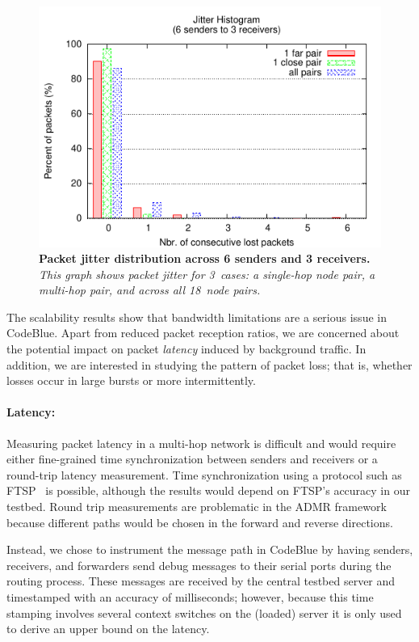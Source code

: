 \begin{figure}[t]
\begin{center}
\includegraphics[width=.6\hsize]{./resources/codeblue-nsdi06/figures/jitter6Send3Recv.pdf}
\end{center}
\caption{{\small {\bf Packet jitter distribution across 
6 senders and 3 receivers.} {\em This graph shows packet jitter
for 3~cases: a single-hop node pair, a multi-hop pair, and
across all 18~node pairs.}}}
\label{fig-jitter6Send3Recv}
\end{figure}

The scalability results show that bandwidth limitations are a serious
issue in CodeBlue. Apart from reduced
packet reception ratios, we are concerned about the potential
impact on packet {\em latency} induced by background traffic.
In addition, we are interested in studying the pattern of packet
loss; that is, whether losses occur in large bursts or more intermittently.

\paragraph*{Latency:}
Measuring packet latency in a multi-hop network is difficult and would 
require either fine-grained time synchronization between senders and 
receivers or a round-trip latency measurement. Time synchronization
using a protocol such as FTSP~\cite{ftsp} is possible, although the
results would depend on FTSP's accuracy in our testbed.
Round trip measurements are problematic in the ADMR framework 
because different paths would be chosen in the forward and reverse 
directions. 

Instead, we chose to instrument the message path in CodeBlue by having
senders, receivers, and forwarders send debug messages to their serial
ports during the routing process. These messages are received by the
central testbed server and timestamped with an accuracy of
milliseconds; however, because this time stamping involves several
context switches on the (loaded) server it is only used to derive an
upper bound on the latency.

